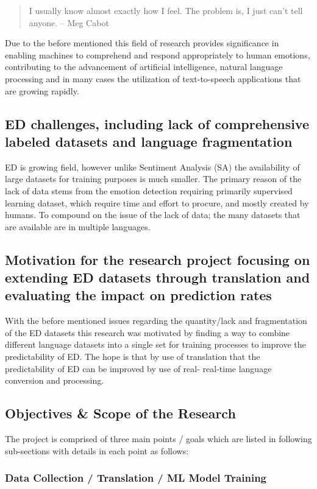 \documentclass[11pt]{article}
\begin{document}
\begin{quote}
    I usually know almost exactly how I feel. The problem is, I just can’t tell anyone.
    \flushright -- Meg Cabot
\end{quote}

Due to the before mentioned this field of research provides significance in enabling machines to comprehend and respond appropriately to human emotions, contributing to the advancement of artificial intelligence, natural language processing and in many cases the utilization of text-to-speech applications that are growing rapidly.

\subsection{ED challenges, including lack of comprehensive labeled datasets and language fragmentation}
ED is growing field, however unlike Sentiment Analysis (SA) the availability of large datasets for training purposes is much smaller. The primary reason of the lack of data stems from the emotion detection requiring primarily supervised learning dataset, which require time and effort to procure, and mostly created by humans. To compound on the issue of the lack of data; the many datasets that are available are in multiple languages.

\subsection{Motivation for the research project focusing on extending ED datasets through translation and evaluating the impact on prediction rates}
With the before mentioned issues regarding the quantity/lack and fragmentation of the ED datasets this research was motivated by finding a way to combine different language datasets into a single set for training processes to improve the predictability of ED. The hope is that by use of translation that the predictability of ED can be improved by use of real- real-time language conversion and processing.

\subsection{Objectives \& Scope of the Research}
The project is comprised of three main points / goals which are listed in following sub-sections with details in each point as follows:

\subsubsection{Data Collection / Translation / ML Model Training}
\end{document}
